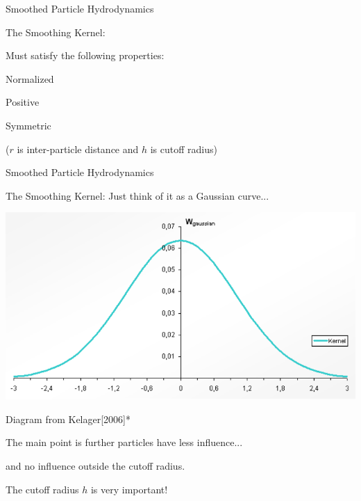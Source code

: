 \documentclass[12pt]{beamer}
\begin{document}
\begin{frame}[t]{Smoothed Particle Hydrodynamics}

\begin{block}{The Smoothing Kernel:}

Must satisfy the following properties:

\vspace{16pt}
\pause

\begin{description}[align=right,labelindent=!]
\item[$\int_\Omega W(r,h)dr=1$] Normalized \pause
\item[$W(r,h)\geq 0$] Positive \pause
\item[$W(r,h)=W(-r,h)$] Symmetric \pause
\end{description}

\vspace{16pt}
\pause
($r$ is inter-particle distance and $h$ is cutoff radius)

\end{block}

\end{frame}


\begin{frame}[t]{Smoothed Particle Hydrodynamics}

\begin{block}{The Smoothing Kernel:}
Just think of it as a Gaussian curve...

\pause

\begin{center}
\includegraphics[scale=0.25]{GaussianKernel}

\color{white}
\tiny{Diagram from Kelager[2006]*}
\end{center}

\pause

The main point is further particles have less influence... \pause 

and no influence outside the cutoff radius. \pause

\small{\alert{The cutoff radius $h$ is very important!}}


\end{block}

\end{frame}
\end{document}
